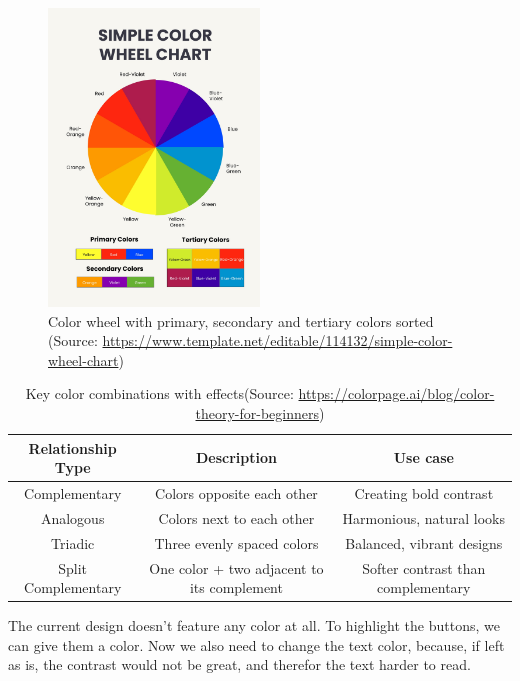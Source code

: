 \begin{figure} [H]
    \center
    \includegraphics [width=0.5\textwidth] {images/paul/colorWheel.jpg}
    \caption{Color wheel with primary, secondary and tertiary colors sorted (Source: \url{https://www.template.net/editable/114132/simple-color-wheel-chart})}
\end{figure}

\begin{table} [H]
    \centering
    \begin{tabular} {|c|c|c|}
        \hline
        \multicolumn{1}{|c|}{\textbf{Relationship Type}} &
        \multicolumn{1}{c|}{\textbf{Description}}  &
        \multicolumn{1}{c|}{\textbf{Use case}}  \\
        
        \hline
        Complementary & Colors opposite each other & Creating bold contrast\\
        \hline
        Analogous & Colors next to each other & Harmonious, natural looks\\
        \hline
        Triadic & Three evenly spaced colors & Balanced, vibrant designs\\
        \hline
        Split Complementary & One color + two adjacent to its complement & Softer contrast than complementary\\
        \hline        
    \end{tabular}
    \caption{Key color combinations with effects(Source: \url{https://colorpage.ai/blog/color-theory-for-beginners})}
    \label{Table:ColorCombinations}
\end{table}

The current design doesn't feature any color at all. To highlight the buttons, we can give them a color. Now we also need to change the text color, because, if left as is, the contrast would not be great, and therefor the text harder to read. \autocite [vgl.]{Paul:ColorTheoryForBeginners}
    
